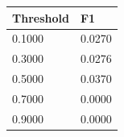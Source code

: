 \begin{tabular}{ll}
\toprule
Threshold & F1 \\
\midrule
0.1000 & 0.0270 \\
0.3000 & 0.0276 \\
0.5000 & 0.0370 \\
0.7000 & 0.0000 \\
0.9000 & 0.0000 \\
\bottomrule
\end{tabular}